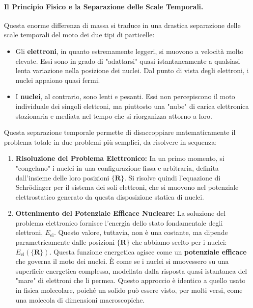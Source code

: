 \paragraph{Il Principio Fisico e la Separazione delle Scale Temporali.}
Questa enorme differenza di massa si traduce in una drastica separazione delle scale temporali del moto dei due tipi di particelle:
\begin{itemize}
    \item Gli \textbf{elettroni}, in quanto estremamente leggeri, si muovono a velocità molto elevate. Essi sono in grado di "adattarsi" quasi istantaneamente a qualsiasi lenta variazione nella posizione dei nuclei. Dal punto di vista degli elettroni, i nuclei appaiono quasi fermi.
    \item I \textbf{nuclei}, al contrario, sono lenti e pesanti. Essi non percepiscono il moto individuale dei singoli elettroni, ma piuttosto una "nube" di carica elettronica stazionaria e mediata nel tempo che si riorganizza attorno a loro.
\end{itemize}
Questa separazione temporale permette di disaccoppiare matematicamente il problema totale in due problemi più semplici, da risolvere in sequenza:
\begin{enumerate}
    \item \textbf{Risoluzione del Problema Elettronico:} In un primo momento, si "congelano" i nuclei in una configurazione fissa e arbitraria, definita dall'insieme delle loro posizioni \(\lbrace \mathbf{R} \rbrace\). Si risolve quindi l'equazione di Schrödinger per il sistema dei soli elettroni, che si muovono nel potenziale elettrostatico generato da questa disposizione statica di nuclei.
    \item \textbf{Ottenimento del Potenziale Efficace Nucleare:} La soluzione del problema elettronico fornisce l'energia dello stato fondamentale degli elettroni, \(E_{\text{el}}\). Questo valore, tuttavia, non è una costante, ma dipende parametricamente dalle posizioni \(\lbrace \mathbf{R} \rbrace\) che abbiamo scelto per i nuclei: \(E_{\text{el}}(\lbrace \mathbf{R} \rbrace)\). Questa funzione energetica agisce come un \textbf{potenziale efficace} che governa il moto dei nuclei. È come se i nuclei si muovessero su una superficie energetica complessa, modellata dalla risposta quasi istantanea del "mare" di elettroni che li permea. Questo approccio è identico a quello usato in fisica molecolare, poiché un solido può essere visto, per molti versi, come una molecola di dimensioni macroscopiche.
\end{enumerate}


